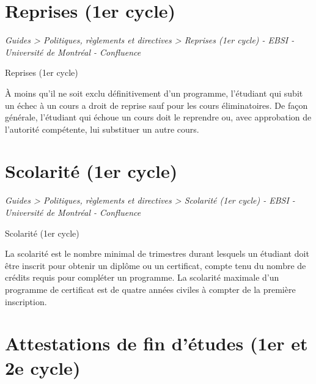 \documentclass [12 pt]{article}
\begin{document}
    
    
        \newpage
        \section {
        Reprises (1er cycle)
        }
        
        
        
        \textit{
        Guides > Politiques, règlements et directives > Reprises (1er cycle) - EBSI -
            Université de Montréal - Confluence
        }
    
        Reprises (1er cycle)
        
            À moins qu'il ne soit exclu définitivement d'un programme, l'étudiant qui subit un
                échec à un cours a droit de reprise sauf pour les cours éliminatoires. De façon
                générale, l'étudiant qui échoue un cours doit le reprendre ou, avec approbation de
                l'autorité compétente, lui substituer un autre cours.
        
    
    
        \newpage
        \section {
        Scolarité (1er cycle)
        }
        
        
        
        \textit{
        Guides > Politiques, règlements et directives > Scolarité (1er cycle) - EBSI -
            Université de Montréal - Confluence
        }
    
        Scolarité (1er cycle)
        
            La scolarité est le nombre minimal de trimestres durant lesquels un étudiant doit
                être inscrit pour obtenir un diplôme ou un certificat, compte tenu du nombre de
                crédits requis pour compléter un programme.
            La scolarité maximale d'un programme de certificat est de quatre années civiles à
                compter de la première inscription.
        
    
    
        \newpage
        \section {
        Attestations de fin d'études (1er et 2e cycle)
        }
        
        
        
\end{document}
